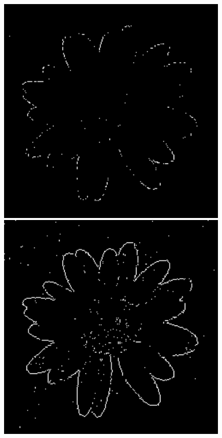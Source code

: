 \documentclass[a4paper]{report}
\begin{document}
\begin{figure}[H]
\centering
\begin{minipage}{.33\textwidth}
  \centering
    \includegraphics[width=0.99\textwidth]{images/Canny/flower_Matlabedge_Roberts.png}
\end{minipage}%
\begin{minipage}{.33\textwidth}
  \centering
  \includegraphics[width=0.99\textwidth]{images/Canny/flower_Matlabedge_Prewitt.png}

\end{minipage}
\end{figure}
\end{document}
